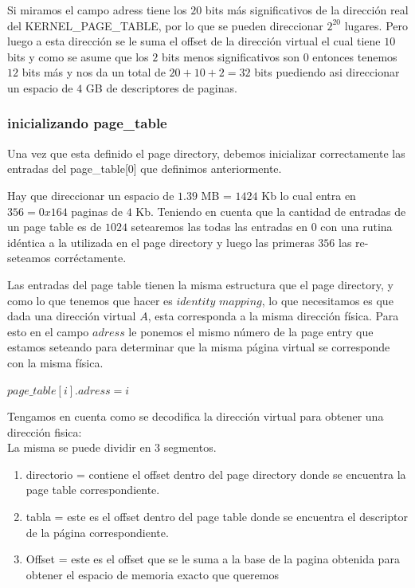 \documentclass[a4paper,10pt,twoside]{article}
\begin{document}
Si miramos el campo adress tiene los $20$ bits más significativos de la dirección real del KERNEL\_PAGE\_TABLE, por lo que se pueden direccionar $2^{20}$ lugares. Pero luego a esta dirección se le suma el offset de la dirección virtual el cual tiene $10$ bits y como se asume que los $2$ bits menos significativos son $0$ entonces tenemos $12$ bits más y nos da un total de $20+10+2=32$ bits puediendo asi direccionar un espacio de $4$ GB de descriptores de paginas.

\subsubsection{inicializando page\_table}
Una vez que esta definido el page directory, debemos inicializar correctamente las entradas del page\_table[0] que definimos anteriormente.

Hay que direccionar un espacio de $1.39$ MB =  $1424$ Kb lo cual entra en $356 = 0x164$ paginas de $4$ Kb. Teniendo en cuenta que la cantidad de entradas de un page table es de $1024$ setearemos las todas las entradas en $0$ con una rutina idéntica a la utilizada en el page directory y luego las primeras $356$ las re-seteamos corréctamente.

Las entradas del page table tienen la misma estructura que el page directory, y como lo que tenemos que hacer es $identity$ $mapping$, lo que necesitamos es que dada una dirección virtual $A$, esta corresponda a la misma dirección física. Para esto en el campo $adress$ le ponemos el mismo número de la page entry que estamos seteando para determinar que la misma página virtual se corresponde con la misma física.

$page\_table[i].adress = i$

Tengamos en cuenta como se decodifica la dirección virtual para obtener una dirección fisica:\\

La misma se puede dividir en $3$ segmentos.

\begin{enumerate}
 \item directorio = contiene el offset dentro del page directory donde se encuentra la page table correspondiente.
 \item tabla = este es el offset dentro del page table donde se encuentra el descriptor de la página correspondiente.
 \item Offset = este es el offset que se le suma a la base de la pagina obtenida para obtener el espacio de memoria exacto que queremos
\end{enumerate}
\end{document}
